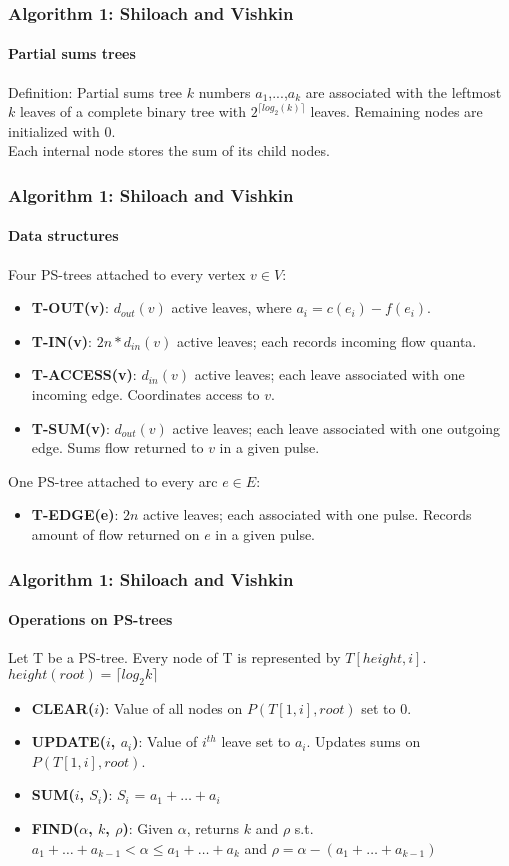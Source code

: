 \documentclass{beamer}
\begin{document}
\begin{frame}
\frametitle{Algorithm 1: Shiloach and Vishkin}
\framesubtitle{Partial sums trees} 
\begin{block}{Definition: Partial sums tree}
$k$ numbers $a_1$,...,$a_k$ are associated with the leftmost $k$ leaves of a complete binary tree with $2^{\lceil log_2(k) \rceil}$ leaves. Remaining nodes are initialized with $0$. \\
Each internal node stores the sum of its child nodes.
\end{block}
\end{frame}

\begin{frame}
\frametitle{Algorithm 1: Shiloach and Vishkin}
\framesubtitle{Data structures} 
Four PS-trees attached to every vertex $v\in V$:
\begin{itemize}
	\item \textbf{T-OUT(v)}: $d_{out}(v)$ active leaves, where $a_i=c(e_i)-f(e_i)$.
	\item \textbf{T-IN(v)}: $2n*d_{in}(v)$ active leaves; each records incoming flow quanta.
	\item \textbf{T-ACCESS(v)}: $d_{in}(v)$ active leaves; each leave associated with one incoming edge. Coordinates access to $v$. 
	\item \textbf{T-SUM(v)}: $d_{out}(v)$ active leaves; each leave associated with one outgoing edge. Sums flow returned to $v$ in a given pulse. 
\end{itemize}
One PS-tree attached to every arc $e\in E$:
\begin{itemize}
	\item \textbf{T-EDGE(e)}: $2n$ active leaves; each associated with one pulse. Records amount of flow returned on $e$ in a given pulse.
\end{itemize}
\end{frame}

\begin{frame}
\frametitle{Algorithm 1: Shiloach and Vishkin}
\framesubtitle{Operations on PS-trees}
Let T be a PS-tree. Every node of T is represented by $T[height,i]$. $height(root) = \lceil log_2 k \rceil$
\begin{itemize}
	\item \textbf{CLEAR($i$)}: Value of all nodes on $P(T[1,i],root)$ set to 0.
	\item \textbf{UPDATE($i$, $a_i$)}:  Value of $i^{th}$ leave set to $a_i$. Updates sums on $P(T[1,i],root)$.
	\item \textbf{SUM($i$, $S_i$)}: $S_i$ = $a_1+\ldots +a_i$ 
	\item \textbf{FIND($\alpha$, $k$, $\rho$)}: Given $\alpha$, returns $k$ and $\rho$ s.t.
	$a_1+\ldots +a_{k-1} < \alpha \leq a_1+\ldots +a_k$ and
	$\rho = \alpha - (a_1+\ldots +a_{k-1})$
\end{itemize}
\end{frame}
\end{document}
